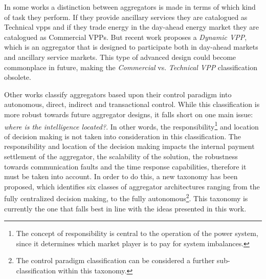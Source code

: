 In some works a distinction between aggregators is made in terms of which kind of task they perform. If they provide ancillary services they are catalogued as Technical \Glspl{vpp} and if they trade energy in the day-ahead energy market they are catalogued as Commercial VPPs. But recent work proposes a \emph{Dynamic VPP}, which is an aggregator that is designed to participate both in day-ahead markets and ancillary service markets. This type of advanced design could become commonplace in future, making the \emph{Commercial} vs. \emph{Technical VPP} classification obsolete.

Other works classify aggregators based upon their control paradigm into autonomous, direct, indirect and transactional control. While this classification is more robust towards future aggregator designs, it falls short on one main issue: \emph{where is the intelligence located?}. In other words, the responsibility\footnote{The concept of responsibility is central to the operation of the power system, since it determines which market player is to pay for system imbalances.} and location of decision making is not taken into consideration in this classification. The responsibility and location of the decision making impacts the internal payment settlement of the aggregator, the scalability of the solution, the robustness towards communication faults and the time response capabilities, therefore it must be taken into account. In order to do this, a new taxonomy has been proposed, which identifies six classes of aggregator architectures ranging from the fully centralized decision making, to the fully autonomous\footnote{The control paradigm classification can be considered a further sub-classification within this taxonomy.}. This taxonomy is currently the one that falls best in line with the ideas presented in this work.

